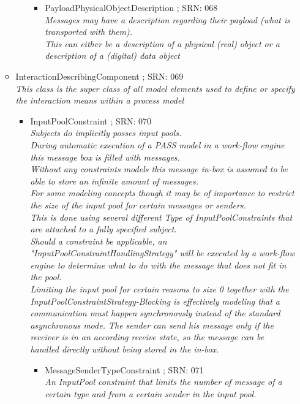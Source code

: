 \begin{itemize}
\begin{itemize}
\begin{itemize}
\begin{itemize}
					\item PayloadPhysicalObjectDescription ; SRN: 068 \\ \textit{Messages may have a description regarding their payload (what is transported with them).\\This can either be a description of a physical (real) object or a description of a (digital) data object}
				\end{itemize}
			\end{itemize}
			\item InteractionDescribingComponent ; SRN: 069 \\ \textit{This class is the super class of all model elements used to define or specify the interaction means within a process model}
			\begin{itemize}
				\item InputPoolConstraint ; SRN: 070 \\ \textit{Subjects do implicitly posses input pools.\\
					During automatic execution of a PASS model in a work-flow engine this message box is filled with messages.\\
					Without any constraints models this message in-box is assumed to be able to store an infinite amount of messages.\\
					For some modeling concepts though it may be of importance to restrict the size of the input pool for certain messages or senders.\\This is done using several different Type of InputPoolConstraints that are attached to a fully specified subject.\\Should a constraint be applicable, an "InputPoolConstraintHandlingStrategy" will be executed by a work-flow engine to determine what to do with the message that does not fit in the pool.\\
					Limiting the input pool for certain reasons to size 0 together with the InputPoolConstraintStrategy-Blocking is effectively modeling that a communication must happen synchronously instead of the standard asynchronous mode. The sender can send his message only if the receiver is in an according receive state, so the message can be handled directly without being stored in the in-box.}
				\begin{itemize}
					\item MessageSenderTypeConstraint ; SRN: 071 \\ \textit{An InputPool constraint that limits the number of message of a certain type and from a certain sender in the input pool.\\
}
\end{itemize}
\end{itemize}
\end{itemize}
\end{itemize}
